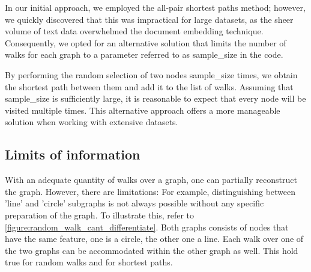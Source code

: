 In our initial approach, we employed the all-pair shortest paths method; however, we quickly discovered that this was impractical for large datasets, as the sheer volume of text data overwhelmed the document embedding technique. Consequently, we opted for an alternative solution that limits the number of walks for each graph to a parameter referred to as sample\_size in the code.

By performing the random selection of two nodes sample\_size times, we obtain the shortest path between them and add it to the list of walks. Assuming that sample\_size is sufficiently large, it is reasonable to expect that every node will be visited multiple times. This alternative approach offers a more manageable solution when working with extensive datasets.

\subsection{Limits of information}
With an adequate quantity of walks over a graph, one can partially reconstruct the graph. However, there are limitations: For example, distinguishing between 'line' and 'circle' subgraphs is not always possible without any specific preparation of the graph. To illustrate this, refer to \autoref{figure:random_walk_cant_differentiate}. Both graphs consists of nodes that have the same feature, one is a circle, the other one a line. Each walk over one of the two graphs can be accommodated within the other graph as well. This hold true for random walks and for shortest paths.

